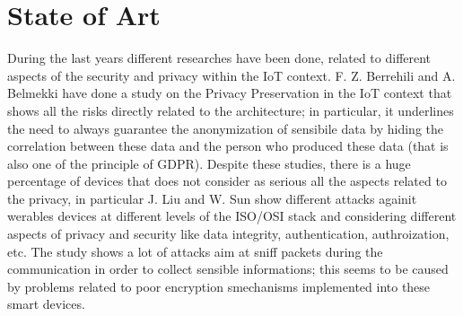 \documentclass[sigconf]{acmart}
\begin{document}
    \section{State of Art}
    During the last years different researches have been done, related to different aspects of the security and privacy within the IoT context.
    F. Z. Berrehili and A. Belmekki \cite{berrehili} have done a study on the Privacy Preservation in the IoT context that shows all the risks directly related to the architecture; in particular, it underlines the need to always guarantee the anonymization of sensibile data by hiding the correlation between these data and the person who produced these data (that is also one of the principle of GDPR).
    Despite these studies, there is a huge percentage of devices that does not consider as serious all the aspects related to the privacy, in particular J. Liu and W. Sun \cite{liu} show different attacks againit werables devices at different levels of the ISO/OSI stack and considering different aspects of privacy and security like data integrity, authentication, authroization, etc. The study shows a lot of attacks aim at sniff packets during the communication in order to collect sensible informations; this seems to be caused by problems related to poor encryption smechanisms implemented into these smart devices.
\end{document}
